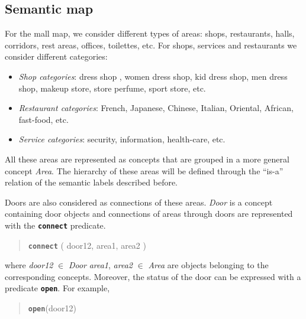 \documentclass{article}
\begin{document}
\subsection {Semantic map}

For the mall map, we consider different types of areas: shops, restaurants, halls, corridors, rest areas, offices, toilettes, etc. For shops, services and restaurants we consider different categories:
\begin{itemize}
\item {\it Shop categories}: dress shop , women dress shop, kid dress shop, men dress shop, makeup store, store perfume, sport store, etc.
\item {\it Restaurant categories}: French, Japanese, Chinese, Italian, Oriental, African, fast-food, etc.
\item {\it Service categories}: security, information, health-care, etc.
\end{itemize}

All these areas are represented as concepts that are grouped in a more general concept \emph{Area}. The hierarchy of these areas will be defined through the ``is-a'' relation of the semantic labels described before.

Doors are also considered as connections of these areas. \emph{Door} is a concept containing door objects and connections of areas through doors are represented with the {\tt\bf connect} predicate.

\begin{quote}
{\bf\tt connect} ( door12, area1, area2 )
\end{quote}

\noindent
where \emph{door12} $\in$ \emph{Door} \emph{area1}, \emph{area2} $\in$ \emph{Area}  are objects belonging to the corresponding concepts. Moreover, the status of the door can be expressed with a predicate {\tt\bf open}. For example,

\begin{quote}
{\tt\bf open}(door12) \\
\end{quote}




\end{document}
